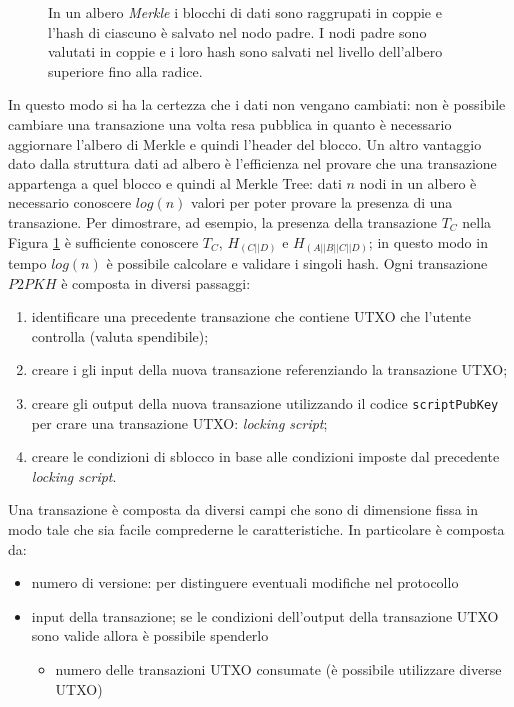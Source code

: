 \begin{enumerate}[1.]
\begin{figure}
    \caption{In un albero \textit{Merkle} i blocchi di dati sono raggrupati in coppie e l'hash di ciascuno è salvato nel nodo padre. I nodi padre sono valutati in coppie e i loro hash sono salvati nel livello dell'albero superiore fino alla radice.}
    \label{fig:merkle}
\end{figure}
In questo modo si ha la certezza che i dati non vengano cambiati: non è possibile cambiare una transazione una volta resa pubblica in quanto è necessario aggiornare l'albero di Merkle e quindi l'header del blocco.
Un altro vantaggio dato dalla struttura dati ad albero è l'efficienza nel provare che una transazione appartenga a quel blocco e quindi al Merkle Tree: dati $n$ nodi in un albero è necessario conoscere $log(n)$ valori per poter provare la presenza di una transazione.\newline
Per dimostrare, ad esempio, la presenza della transazione $T_C$ nella Figura \ref{fig:merkle} è sufficiente conoscere $T_C$, $H_{(C||D)}$ e $H_{(A||B||C||D)}$; in questo modo in tempo  $log(n)$ è possibile calcolare e validare i singoli hash.\newline
Ogni transazione $P2PKH$ è composta in diversi passaggi:
\begin{enumerate}[1.]
    \item identificare una precedente transazione che contiene UTXO che l'utente controlla (valuta spendibile);
    \item creare i gli input della nuova transazione referenziando la transazione UTXO;
    \item creare gli output della nuova transazione utilizzando il codice \texttt{scriptPubKey} per crare una transazione UTXO: \textit{locking script};
    \item creare le condizioni di sblocco in base alle condizioni imposte dal precedente \textit{locking script}.
\end{enumerate}
Una transazione è composta da diversi campi che sono di dimensione fissa in modo tale che sia facile comprederne le caratteristiche. In particolare è composta da:
\begin{itemize}
    \item numero di versione: per distinguere eventuali modifiche nel protocollo
    \item input della transazione; se le condizioni dell'output della transazione UTXO sono valide allora è possibile spenderlo
        \begin{itemize}
            \item numero delle transazioni UTXO consumate (è possibile utilizzare diverse UTXO)

\end{itemize}
\end{itemize}
\end{enumerate}
